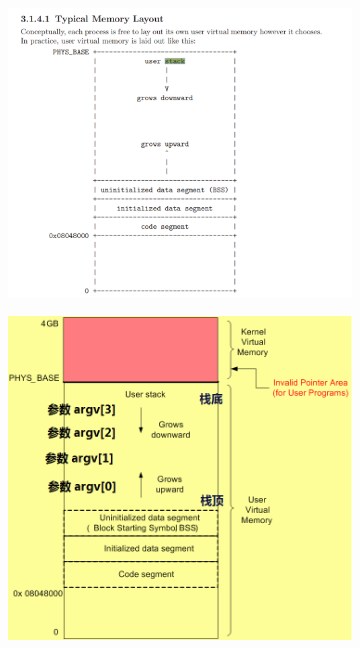 \documentclass[14pt,a4paper,UTF8,twoside]{article}
\begin{document}
\begin{figure}[H]
    \centering
    \begin{subfigure}[b]{0.45\textwidth}
        \centering
        \includegraphics[width=\textwidth]{img5/stack.png}
        \label{fig:left_stack}
    \end{subfigure}
    \hfill
    \begin{subfigure}[b]{0.42\textwidth}
        \centering
        \includegraphics[width=\textwidth]{img5/stackover.png}
        \label{fig:right_stack}
    \end{subfigure}
    \label{fig:stack_subfigures}
\end{figure}
\end{document}
